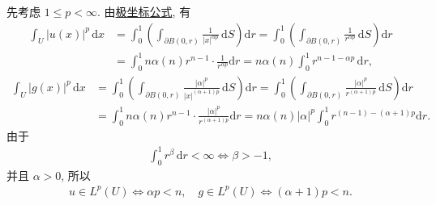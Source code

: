 \documentclass[../../main.tex]{subfiles}
\begin{document}
\begin{solution}
先考虑 $1\leqslant p<\infty$. 由\hyperref[theorem:appC-极坐标]{极坐标公式}, 有
\begin{align*}
\int_U{|u(x)|^p\,\mathrm{d}x}&=\int_0^1{\left( \int_{\partial B\left( 0,r \right)}{\frac{1}{\left| x \right|^{\alpha p}}\,\mathrm{d}S} \right) \mathrm{d}r}=\int_0^1{\left( \int_{\partial B\left( 0,r \right)}{\frac{1}{r^{\alpha p}}\,\mathrm{d}S} \right) \mathrm{d}r}
\\
&=\int_0^1{n\alpha \left( n \right) r^{n-1}\cdot \frac{1}{r^{\alpha p}}\mathrm{d}r}=n\alpha (n)\int_0^1{r^{n-1-\alpha p}\,\mathrm{d}r},
\end{align*}
\begin{align*}
\int_U{\left| g\left( x \right) \right|^p\,\mathrm{d}x}&=\int_0^1{\left( \int_{\partial B\left( 0,r \right)}{\frac{\left| \alpha \right|^p}{\left| x \right|^{\left( \alpha +1 \right) p}}\,\mathrm{d}S} \right) \mathrm{d}r}=\int_0^1{\left( \int_{\partial B\left( 0,r \right)}{\frac{\left| \alpha \right|^p}{r^{\left( \alpha +1 \right) p}}\,\mathrm{d}S} \right) \mathrm{d}r}
\\
&=\int_0^1{n\alpha \left( n \right) r^{n-1}\cdot \frac{\left| \alpha \right|^p}{r^{\left( \alpha +1 \right) p}}\mathrm{d}r}=n\alpha \left( n \right) \left| \alpha \right|^p\int_0^1{r^{\left( n-1 \right) -\left( \alpha +1 \right) p}\mathrm{d}r}.
\end{align*}
由于
\begin{align*}
\int_0^1r^\beta\,\mathrm{d}r<\infty
\Longleftrightarrow
\beta>-1,
\end{align*}
并且 $\alpha>0$, 所以
\begin{align}
u\in L^p(U)
\Longleftrightarrow
\alpha p<n,
\quad
g\in L^p(U)
\Longleftrightarrow
(\alpha+1)p<n.
\label{align:ch05-径向奇异-梯度可积性}
\end{align}


\end{solution}
\end{document}
